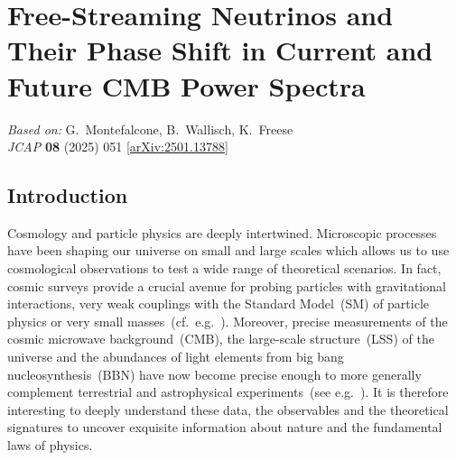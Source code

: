 \chapter{Free-Streaming Neutrinos and Their Phase Shift in Current and Future CMB Power Spectra}
\label{ch:neutrino-phase-shift}

\begin{center}
\textit{Based on:} G.~Montefalcone, B.~Wallisch, K.~Freese\\
\textit{JCAP} \textbf{08} (2025) 051
[\href{https://arxiv.org/abs/2501.13788}{arXiv:2501.13788}]
\end{center}
\vspace{1em}

\renewcommand{\d}{\mathrm{d}}
\providecommand{\ee}{\mathrm{e}}
\providecommand{\As}{A_\mathrm{s}}
\providecommand{\ns}{n_\mathrm{s}}
\providecommand{\Neff}{N_\mathrm{eff}}
\providecommand{\Nphase}{N_\mathrm{eff}^{\delta\phi}}
\providecommand{\Nmultipole}{N_\mathrm{eff}^{\delta\ell}}


\section{Introduction}
\label{ch12-sec:introduction}

Cosmology and particle physics are deeply intertwined. Microscopic processes have been shaping our universe on small and large scales which allows us to use cosmological observations to test a wide range of theoretical scenarios. In fact, cosmic surveys provide a crucial avenue for probing particles with gravitational interactions, very weak couplings with the Standard Model~(SM) of particle physics or very small masses~(cf.~e.g.~\cite{Flauger:2022hie, Amin:2022soj, Green:2022hhj}). Moreover, precise measurements of the cosmic microwave background~(CMB), the large-scale structure~(LSS) of the universe and the abundances of light elements from big bang nucleosynthesis~(BBN) have now become precise enough to more generally complement terrestrial and astrophysical experiments~(see e.g.~\cite{Annis:2022xgg, Chang:2022lrw}). It is therefore interesting to deeply understand these data, the observables and the theoretical signatures to uncover exquisite information about nature and the fundamental laws of physics.\medskip

